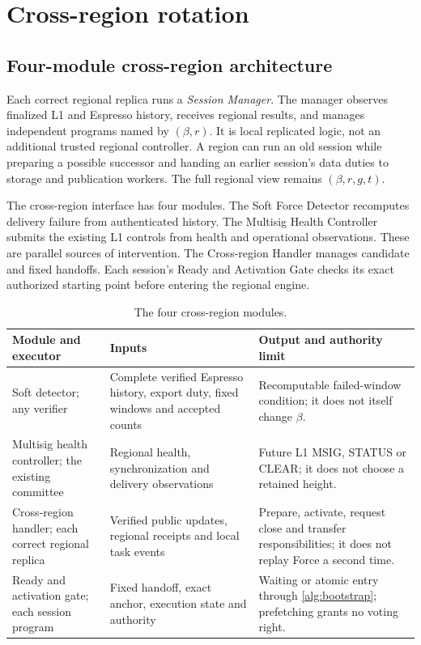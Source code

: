\documentclass[11pt,a4paper]{article}
\newcommand{\defterm}[1]{\textcolor{rrBlue}{\textit{#1}}}
\newcounter{protocol}
\begin{document}
\section{Cross-region rotation}
\label{sec:xprotocols}

\subsection{Four-module cross-region architecture}
\label{sec:runtime-modules}
Each correct regional replica runs a \defterm{Session Manager}. The
manager observes finalized L1 and Espresso history, receives regional
results, and manages independent programs named by $(\beta,r)$.
It is local replicated logic, not an additional trusted regional
controller. A region can run an old session while preparing a possible
successor and handing an earlier session's data duties to storage and
publication workers. The full regional view remains $(\beta,r,g,t)$.

The cross-region interface has four modules. The Soft Force Detector
recomputes delivery failure from authenticated history. The Multisig
Health Controller submits the existing L1 controls from health and
operational observations. These are parallel sources of intervention.
The Cross-region Handler manages candidate and fixed handoffs. Each
session's Ready and Activation Gate checks its exact authorized starting
point before entering the regional engine.

\begin{table}[htbp]\centering\small
\caption{The four cross-region modules.}
\label{tab:runtime-modules}
\begin{tabularx}{\linewidth}{@{}>{\raggedright\arraybackslash}p{.22\linewidth}Y Y@{}}\toprule
Module and executor & Inputs & Output and authority limit\\\midrule
Soft detector; any verifier & Complete verified Espresso history,
export duty, fixed windows and accepted counts & Recomputable failed-window
condition; it does not itself change $\beta$.\\
Multisig health controller; the existing committee & Regional health,
synchronization and delivery observations & Future L1 MSIG, STATUS or
CLEAR; it does not choose a retained height.\\
Cross-region handler; each correct regional replica & Verified public
updates, regional receipts and local task events & Prepare, activate,
request close and transfer responsibilities; it does not replay Force
a second time.\\
Ready and activation gate; each session program & Fixed handoff,
exact anchor, execution state and authority & Waiting or atomic entry
through \cref{alg:bootstrap}; prefetching grants no voting right.\\\bottomrule
\end{tabularx}
\end{table}
\end{document}
